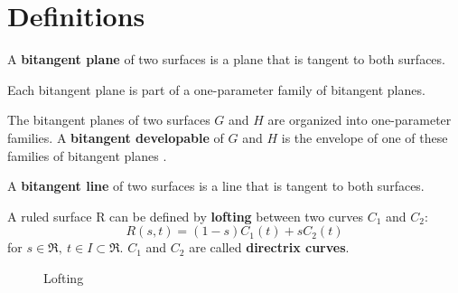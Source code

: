 \documentclass[12pt]{article}
\newif\ifJournal
\begin{document}
\clearpage


\section{Definitions}

\begin{defn2}
A {\bf bitangent plane} of two surfaces is a plane that is tangent to
both surfaces.
\end{defn2}

Each bitangent plane is part of a one-parameter family of bitangent planes.

\begin{defn2}
The bitangent planes of two surfaces $G$ and $H$ 
are organized into one-parameter families.
A {\bf bitangent developable} of $G$ and $H$ is 
the envelope of one of these families of bitangent planes \cite{koenderink}.
\end{defn2}

\ifJournal
\begin{defn2}
A bitangent plane of $G$ and $H$ is {\bf inner} if 
$G$ and $H$ lie on opposite sides of the bitangent plane
(in the local neighbourhood of the points of tangency).
It is {\bf outer} if 
$G$ and $H$ (locally) lie on the same side of the bitangent plane.

A bitangent developable of $G$ and $H$ is {\bf inner} (resp., outer) if 
it is the envelope of a family of inner (resp., outer) bitangent planes
of $G$ and $H$.
\end{defn2}
\fi

\begin{defn2}
A {\bf bitangent line} of two surfaces is a line that is tangent to both
surfaces.
\end{defn2}

\begin{defn2}
\label{defn:lofting}
A ruled surface R can be defined by {\bf lofting} between two curves
$C_1$ and $C_2$:
\[
	R(s,t) = (1-s) C_1(t) + sC_2(t)
\]
for $s \in \Re,\ t \in I \subset \Re$. %
$C_1$ and $C_2$ are called {\bf directrix curves}.
\end{defn2}

\begin{figure}[b]
\caption{Lofting}
\label{fig:loft}
\end{figure}
	
\end{document}
